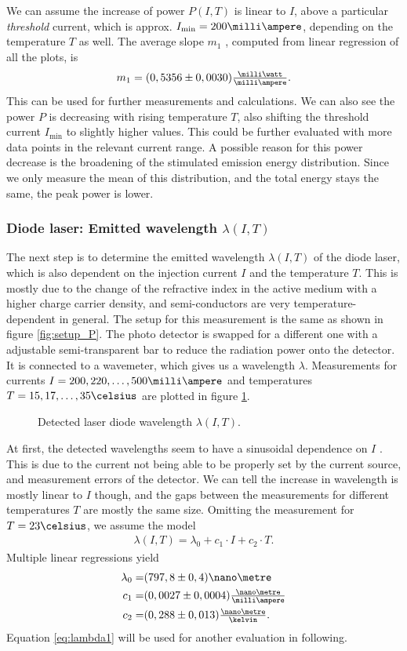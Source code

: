 We can assume the increase of power $P(I,T)$ is linear to $I$, above a particular \emph{threshold} current, which is approx. $I_\text{min}=200\milli\ampere$, depending on the temperature $T$ as well. The average slope $m_1$ , computed from linear regression of all the plots, is
\begin{align}
m_1=(0,5356\pm 0,0030)\tfrac{\milli\watt}{\milli\ampere}.
\label{eq:avg_slope1}
\end{align}
This can be used for further measurements and calculations.
We can also see the power $P$ is decreasing with rising temperature $T$, also shifting the threshold current $I_\text{min}$ to slightly higher values. This could be further evaluated with more data points in the relevant current range.
A possible reason for this power decrease is the broadening of the stimulated emission energy distribution. Since we only measure the mean of this distribution, and the total energy stays the same, the peak power is lower.
\subsubsection{Diode laser: Emitted wavelength $\lambda(I,T)$}
\label{sec:diode_laser_lambda}
The next step is to determine the emitted wavelength $\lambda(I,T)$ of the diode laser, which is also dependent on the injection current $I$ and the temperature $T$. This is mostly due to the change of the refractive index in the active medium with a higher charge carrier density, and semi-conductors are very temperature-dependent in general.
The setup for this measurement is the same as shown in figure \ref{fig:setup_P}. The photo detector is swapped for a different one with a adjustable semi-transparent bar to reduce the radiation power onto the detector. It is connected to a wavemeter, which gives us a wavelength $\lambda$.
Measurements for currents $I=200,220,\dots,500\milli\ampere$ and temperatures $T=15,17,\dots,35\celsius$ are plotted in figure \ref{fig:lambda1}.

\begin{figure}[h]
	\centering
	
	\caption{Detected laser diode wavelength $\lambda(I,T)$.}
	\label{fig:lambda1}
\end{figure}

At first, the detected wavelengths seem to have a sinusoidal dependence on $I$ . This is due to the current not being able to be properly set by the current source, and measurement errors of the detector. We can tell the increase in wavelength is mostly linear to $I$ though, and the gaps between the measurements for different temperatures $T$ are mostly the same size.
Omitting the measurement for $T=23\celsius$, we assume the model
\begin{align}
\lambda(I,T)=\lambda_0+c_1\cdot I+c_2\cdot T.
\label{eq:lambda1}
\end{align}
Multiple linear regressions yield
\begin{align*}
\lambda_0=&(797,8\pm 0,4)\nano\metre\\
c_1=&(0,0027\pm 0,0004)\tfrac{\nano\metre}{\milli\ampere}\\
c_2=&(0,288\pm 0,013)\tfrac{\nano\metre}{\kelvin}.
\end{align*}
Equation \eqref{eq:lambda1} will be used for another evaluation in following.
